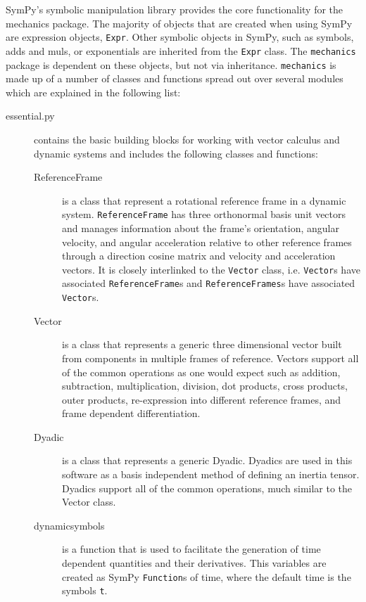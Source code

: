 \documentclass[twocolumn,10pt]{asme2e}
\begin{document}
SymPy's symbolic manipulation library provides the core functionality for the
mechanics package. The majority of objects that are created when using SymPy
are expression objects, \verb|Expr|. Other symbolic objects in SymPy, such as
symbols, adds and muls, or exponentials are inherited from the \verb|Expr|
class. The \verb|mechanics| package is dependent on these objects, but not via
inheritance. \verb|mechanics| is made up of a number of classes and functions
spread out over several modules which are explained in the following list:
%
\begin{description}
  \item[essential.py] contains the basic building blocks for working with
    vector calculus and dynamic systems and includes the following classes and
    functions:
    \begin{description}
      \item[ReferenceFrame] is a class that represent a rotational reference
        frame in a dynamic system. \verb|ReferenceFrame| has three orthonormal
        basis unit vectors and manages information about the frame's
        orientation, angular velocity, and angular acceleration relative to
        other reference frames through a direction cosine matrix and velocity
        and acceleration vectors. It is closely interlinked to the
        \verb|Vector| class, i.e. \verb|Vector|s have associated
        \verb|ReferenceFrame|s and \verb|ReferenceFrames|s have associated
        \verb|Vector|s.
      \item[Vector] is a class that represents a generic three dimensional
        vector built from components in multiple frames of reference. Vectors
        support all of the common operations as one would expect such as
        addition, subtraction, multiplication, division, dot products, cross
        products, outer products, re-expression into different reference
        frames, and frame dependent differentiation.
      \item[Dyadic] is a class that represents a generic Dyadic. Dyadics are
        used in this software as a basis independent method of defining an
        inertia tensor. Dyadics support all of the common operations, much
        similar to the Vector class.
      \item[dynamicsymbols] is a function that is used to facilitate the generation
        of time dependent quantities and their derivatives. This variables are
        created as SymPy \verb|Function|s of time, where the default time is
        the symbols \verb|t|.

\end{description}
\end{description}
\end{document}

